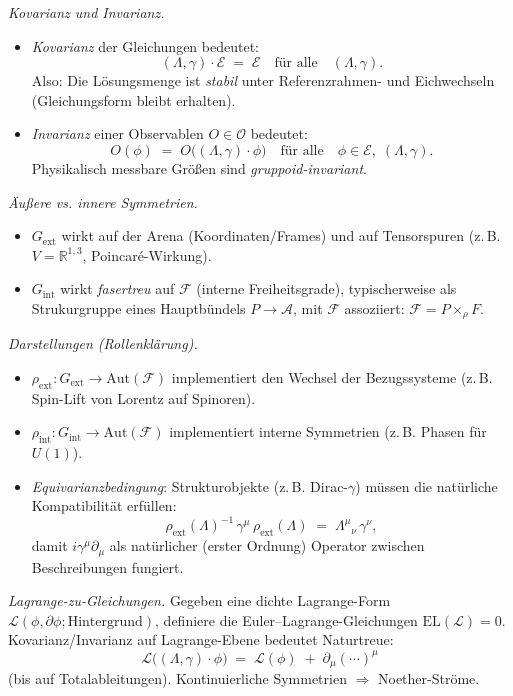 \documentclass[10pt, letterpaper]{article}
\newcommand{\R}{\mathbb{R}}
\begin{document}
\emph{Kovarianz und Invarianz.}
\begin{itemize}
\item \emph{Kovarianz} der Gleichungen bedeutet:
\[
(\Lambda,\gamma)\cdot \mathcal{E} \;=\; \mathcal{E}
\quad\text{für alle}\quad (\Lambda,\gamma).
\]
Also: Die Lösungsmenge ist \emph{stabil} unter Referenzrahmen- und Eichwechseln (Gleichungsform bleibt erhalten).
\item \emph{Invarianz} einer Observablen $O\in\mathcal{O}$ bedeutet:
\[
O(\phi) \;=\; O\!\big((\Lambda,\gamma)\cdot\phi\big)
\quad\text{für alle}\quad \phi\in \mathcal{E},\;(\Lambda,\gamma).
\]
Physikalisch messbare Größen sind \emph{gruppoid-invariant}.
\end{itemize}

\emph{Äußere vs. innere Symmetrien.}
\begin{itemize}
\item $G_{\mathrm{ext}}$ wirkt auf der Arena (Koordinaten/Frames) und auf Tensorspuren (z.\,B. $V=\R^{1,3}$, Poincaré-Wirkung).
\item $G_{\mathrm{int}}$ wirkt \emph{fasertreu} auf $\mathcal{F}$ (interne Freiheitsgrade), typischerweise als Strukurgruppe eines Hauptbündels $P\to \mathcal{A}$, mit $\mathcal{F}$ assoziiert: $\mathcal{F}=P\times_\rho F$.
\end{itemize}

\emph{Darstellungen (Rollenklärung).}
\begin{itemize}
\item $\rho_{\mathrm{ext}}: G_{\mathrm{ext}}\to \mathrm{Aut}(\mathcal{F})$ implementiert den Wechsel der Bezugssysteme (z.\,B. Spin-Lift von Lorentz auf Spinoren).
\item $\rho_{\mathrm{int}}: G_{\mathrm{int}}\to \mathrm{Aut}(\mathcal{F})$ implementiert interne Symmetrien (z.\,B. Phasen für $U(1)$).
\item \emph{Equivarianzbedingung}: Strukturobjekte (z.\,B. Dirac-$\gamma$) müssen die natürliche Kompatibilität erfüllen:
\[
\rho_{\mathrm{ext}}(\Lambda)^{-1}\,\gamma^\mu\,\rho_{\mathrm{ext}}(\Lambda)
\;=\; \Lambda^\mu{}_\nu \,\gamma^\nu,
\]
damit $i\gamma^\mu\partial_\mu$ als natürlicher (erster Ordnung) Operator zwischen Beschreibungen fungiert.
\end{itemize}

\emph{Lagrange-zu-Gleichungen.}
Gegeben eine dichte Lagrange-Form $\mathcal{L}(\phi,\partial\phi; \text{Hintergrund})$, definiere die Euler–Lagrange-Gleichungen
$\mathrm{EL}(\mathcal{L})=0$.
Kovarianz/Invarianz auf Lagrange-Ebene bedeutet Naturtreue:
\[
\mathcal{L}\big((\Lambda,\gamma)\cdot\phi\big)
\;=\; \mathcal{L}(\phi) \;+\; \partial_\mu(\cdots)^\mu
\]
(bis auf Totalableitungen). Kontinuierliche Symmetrien $\Rightarrow$ Noether-Ströme.
\end{document}
